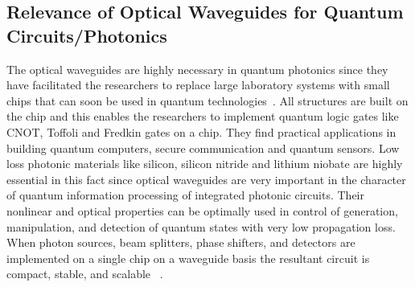 \subsection{Relevance of Optical Waveguides for Quantum Circuits/Photonics}
The optical waveguides are highly necessary in quantum photonics since they have facilitated the researchers to replace large laboratory systems with small chips that can soon be used in quantum technologies~\cite{OBrien2009,Politi2008}. All structures are built on the chip and this enables the researchers to implement quantum logic gates like CNOT, Toffoli and Fredkin gates on a chip. They find practical applications in building quantum computers, secure communication and quantum sensors\cite{OBrien2007,Politi2008,OBrien2009}. Low loss photonic materials like silicon, silicon nitride and lithium niobate are highly essential in this fact since optical waveguides are very important in the character of quantum information processing of integrated photonic circuits. Their nonlinear and optical properties can be optimally used in control of generation, manipulation, and detection of quantum states with very low propagation loss. When photon sources, beam splitters, phase shifters, and detectors are implemented on a single chip on a waveguide basis the resultant circuit is compact, stable, and scalable ~\cite{ChenLiuKoehlerTabatabaeiGuoSunYangWangBelingYi2025,KatiyiKarabchevsky2025}.

